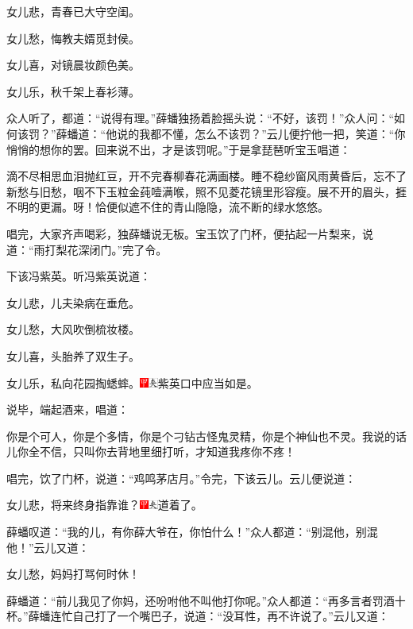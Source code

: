 女儿悲，青春已大守空闺。

女儿愁，悔教夫婿觅封侯。

女儿喜，对镜晨妆颜色美。

女儿乐，秋千架上春衫薄。

众人听了，都道：“说得有理。”薛蟠独扬着脸摇头说：“不好，该罚！”众人问：“如何该罚？”薛蟠道：“他说的我都不懂，怎么不该罚？”云儿便拧他一把，笑道：“你悄悄的想你的罢。回来说不出，才是该罚呢。”于是拿琵琶听宝玉唱道：

滴不尽相思血泪抛红豆，开不完春柳春花满画楼。睡不稳纱窗风雨黄昏后，忘不了新愁与旧愁，咽不下玉粒金莼噎满喉，照不见菱花镜里形容瘦。展不开的眉头，捱不明的更漏。呀！恰便似遮不住的青山隐隐，流不断的绿水悠悠。

唱完，大家齐声喝彩，独薛蟠说无板。宝玉饮了门杯，便拈起一片梨来，说道：“雨打梨花深闭门。”完了令。

下该冯紫英。听冯紫英说道：

女儿悲，儿夫染病在垂危。

女儿愁，大风吹倒梳妆楼。

女儿喜，头胎养了双生子。

女儿乐，私向花园掏蟋蟀。{\includegraphics[width=3mm]{../Images/00002}\includegraphics[width=3mm]{../Images/00012}\footnotesize \kaishu 紫英口中应当如是。}

说毕，端起酒来，唱道：

你是个可人，你是个多情，你是个刁钻古怪鬼灵精，你是个神仙也不灵。我说的话儿你全不信，只叫你去背地里细打听，才知道我疼你不疼！

唱完，饮了门杯，说道：“鸡鸣茅店月。”令完，下该云儿。云儿便说道：

女儿悲，将来终身指靠谁？{\includegraphics[width=3mm]{../Images/00002}\includegraphics[width=3mm]{../Images/00012}\footnotesize \kaishu 道着了。}

薛蟠叹道：“我的儿，有你薛大爷在，你怕什么！”众人都道：“别混他，别混他！”云儿又道：

女儿愁，妈妈打骂何时休！

薛蟠道：“前儿我见了你妈，还吩咐他不叫他打你呢。”众人都道：“再多言者罚酒十杯。”薛蟠连忙自己打了一个嘴巴子，说道：“没耳性，再不许说了。”云儿又道：

